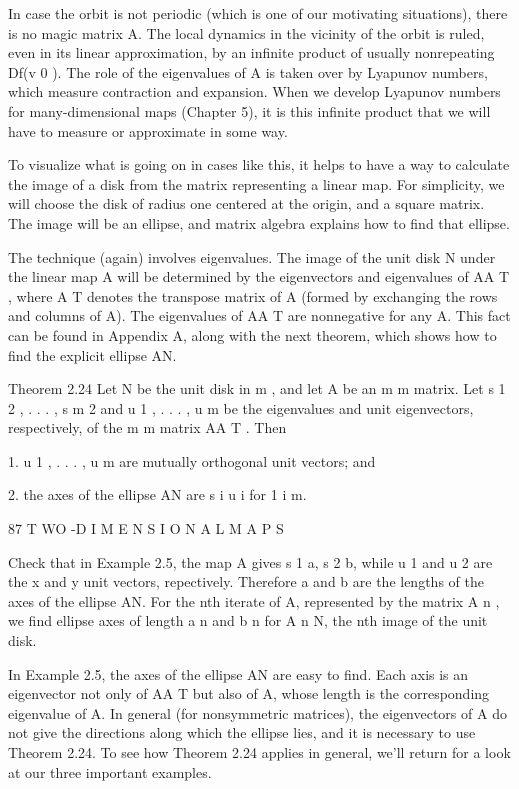 \documentclass[12pt]{article}
\begin{document}
In case the orbit is not periodic (which is one of our motivating situations), there is no magic matrix A. The local dynamics in the 
vicinity of the orbit is ruled, even in its linear approximation, by an inﬁnite product of usually nonrepeating Df(v 0 ). The role 
of the eigenvalues of A is taken over by Lyapunov numbers, which measure contraction and expansion. When we develop Lyapunov numbers 
for many-dimensional maps (Chapter 5), it is this inﬁnite product that we will have to measure or approximate in some way.

To visualize what is going on in cases like this, it helps to have a way to calculate the image of a disk from the matrix 
representing a linear map. For simplicity, we will choose the disk of radius one centered at the origin, and a square matrix. The 
image will be an ellipse, and matrix algebra explains how to ﬁnd that ellipse.

The technique (again) involves eigenvalues. The image of the unit disk N under the linear map A will be determined by the 
eigenvectors and eigenvalues of AA T , where A T denotes the transpose matrix of A (formed by exchanging the rows and columns of A). 
The eigenvalues of AA T are nonnegative for any A. This fact can be found in Appendix A, along with the next theorem, which shows how 
to ﬁnd the explicit ellipse AN.

Theorem 2.24 Let N be the unit disk in  m , and let A be an m m matrix. Let s 1 2 , . . . , s m 2 and u 1 , . . . , u m be the 
eigenvalues and unit eigenvectors, respectively, of the m m matrix AA T . Then

1. u 1 , . . . , u m are mutually orthogonal unit vectors; and

2. the axes of the ellipse AN are s i u i for 1 i m.

87 T WO -D I M E N S I O N A L M A P S

Check that in Example 2.5, the map A gives s 1  a, s 2  b, while u 1 and u 2 are the x and y unit vectors, repectively. Therefore a 
and b are the lengths of the axes of the ellipse AN. For the nth iterate of A, represented by the matrix A n , we ﬁnd ellipse axes 
of length a n and b n for A n N, the nth image of the unit disk.

In Example 2.5, the axes of the ellipse AN are easy to ﬁnd. Each axis is an eigenvector not only of AA T but also of A, whose length 
is the corresponding eigenvalue of A. In general (for nonsymmetric matrices), the eigenvectors of A do not give the directions along 
which the ellipse lies, and it is necessary to use Theorem 2.24. To see how Theorem 2.24 applies in general, we’ll return for a look 
at our three important examples.
\end{document}
